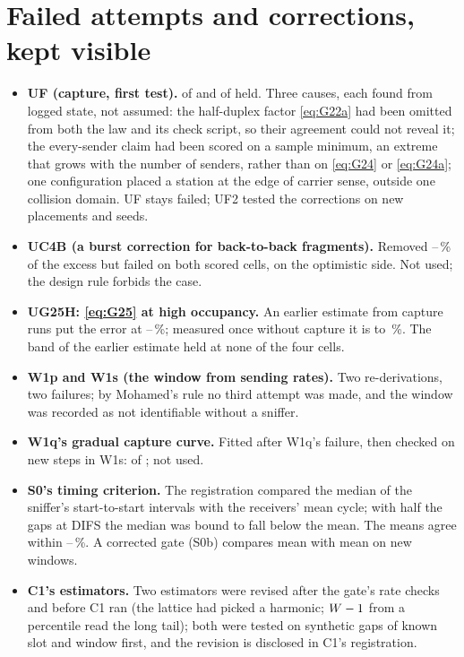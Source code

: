 \documentclass[11pt,a4paper]{article}
\begin{document}
\section{Failed attempts and corrections, kept visible}

\begin{itemize}
\item \textbf{UF (capture, first test).} \ufAvgHeld{} of \ufConfigs{} and \ufWorstHeld{} of
\ufConfigs{} held. Three causes, each found from logged state, not assumed: the half-duplex factor
\eqref{eq:G22a} had been omitted from both the law and its check script, so their agreement could not
reveal it; the every-sender claim had been scored on a sample minimum, an extreme that grows with
the number of senders, rather than on \eqref{eq:G24} or \eqref{eq:G24a}; one configuration placed a
station at the edge of carrier sense, outside one collision domain. UF stays failed; UF2 tested the
corrections on new placements and seeds.
\item \textbf{UC4B (a burst correction for back-to-back fragments).} Removed
\burstFixMin--\burstFixMax\,\% of the excess but failed on both scored cells, on the optimistic
side. Not used; the design rule forbids the case.
\item \textbf{UG25H: \eqref{eq:G25} at high occupancy.} An earlier estimate from capture runs put
the error at \fOneFortyMin--\fOneFortyMax\,\%; measured once without capture it is \uhMin{} to \uhMax\,\%. The band of
the earlier estimate held at none of the four cells.
\item \textbf{W1p and W1s (the window from sending rates).} Two re-derivations, two failures; by
Mohamed's rule no third attempt was made, and the window was recorded as not identifiable without a
sniffer.
\item \textbf{W1q's gradual capture curve.} Fitted after W1q's failure, then checked on new steps in
W1s: \wsCurveHeld{} of \wsCurveScored{}; not used.
\item \textbf{S0's timing criterion.} The registration compared the median of the sniffer's
start-to-start intervals with the receivers' mean cycle; with half the gaps at DIFS the median was
bound to fall below the mean. The means agree within \sZeroMeanMin--\sZeroMeanMax\,\%. A corrected gate (S0b) compares
mean with mean on new windows.
\item \textbf{C1's estimators.} Two estimators were revised after the gate's rate checks and before
C1 ran (the lattice had picked a harmonic; $W-1$ from a percentile read the long tail); both were
tested on synthetic gaps of known slot and window first, and the revision is disclosed in C1's
registration.
\end{itemize}
\end{document}

